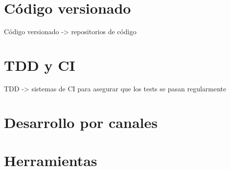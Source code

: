 \section{Código versionado}
\label{sec:codigo-versionado}

\par Código versionado -> repositorios de código


\section{TDD y CI}
\label{sec:tdd-ci}

\par TDD -> sistemas de CI para asegurar que los tests se pasan regularmente


\section{Desarrollo por canales}
\label{sec:desarrollo-canales}


\section{Herramientas}
\label{sec:herramientas}

